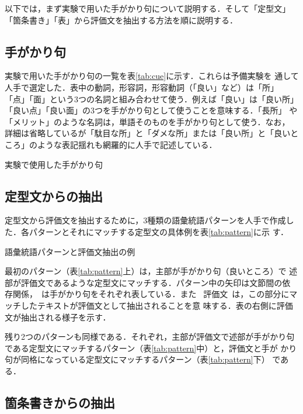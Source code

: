 \documentclass[japanese]{jnlp_1.4}
\begin{document}
\noindent
以下では，まず実験で用いた手がかり句について説明する．そして「定型文」
「箇条書き」「表」から評価文を抽出する方法を順に説明する．


\subsection{手がかり句}

実験で用いた手がかり句の一覧を表\ref{tab:cue}に示す．これらは予備実験を
通して人手で選定した．表中の動詞，形容詞，形容動詞（「良い」など）は「所」
「点」「面」という3つの名詞と組み合わせて使う．例えば「良い」は「良い所」
「良い点」「良い面」の3つを手がかり句として使うことを意味する．「長所」
や「メリット」のような名詞は，単語そのものを手がかり句として使う．なお，
詳細は省略しているが「駄目な所」と「ダメな所」または「良い所」と「良いと
ころ」のような表記揺れも網羅的に人手で記述している．

\begin{table}[b]
  \caption{実験で使用した手がかり句}
  \label{tab:cue}

\end{table}


\subsection{定型文からの抽出}

定型文から評価文を抽出するために，3種類の語彙統語パターンを人手で作成し
た．各パターンとそれにマッチする定型文の具体例を表\ref{tab:pattern}に示
す．

\begin{table}[b]
  \caption{語彙統語パターンと評価文抽出の例}
  \label{tab:pattern}

\end{table}

最初のパターン（表\ref{tab:pattern}上）は，主部が手がかり句（良いところ）で
述部が評価文であるような定型文にマッチする．パターン中の矢印は文節間の依
存関係，\ は手がかり句をそれぞれ表している．また\ \ovalbox
{評価文}\ は，この部分にマッチしたテキストが評価文として抽出されることを意
味する．表の右側に評価文が抽出される様子を示す．

残り2つのパターンも同様である．それぞれ，主部が評価文で述部が手がかり句
である定型文にマッチするパターン（表\ref{tab:pattern}中）と，評価文と手が
かり句が同格になっている定型文にマッチするパターン（表\ref{tab:pattern}下）
である．


\subsection{箇条書きからの抽出}
\end{document}
